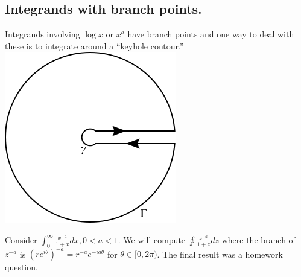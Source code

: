 \documentclass[11pt,leqno,oneside]{amsart}
\numberwithin{thm}{section}
\begin{document}
  \subsection*{Integrands with branch points.}
  Integrands involving $\log x$ or $x^a$ have branch points and one
  way to deal with these is to integrate around a ``keyhole contour.'' \\
  \includegraphics[scale=0.5]{keyhole_contour.png} \\
  \begin{example}
    Consider $\int_0^\infty \frac{x^{-a}}{1+x}dx, 0 < a < 1$. We will
    compute $\oint \frac{z^{-a}}{1+z}dz$ where the branch
    of $z^{-a}$ is $(re^{i\theta})^{-a} = r^{-a}e^{-ia\theta}$ for
    $\theta \in [0,2\pi)$. The final result was a homework question.
  \end{example}
\end{document}
